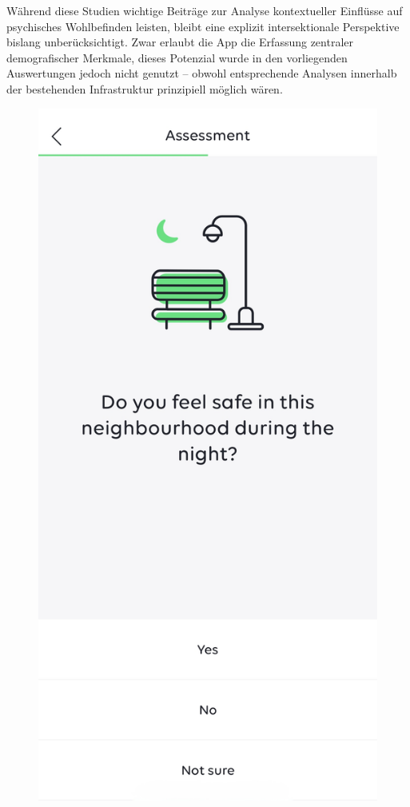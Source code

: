 Während diese Studien wichtige Beiträge zur Analyse kontextueller Einflüsse auf psychisches Wohlbefinden leisten, bleibt eine explizit intersektionale Perspektive bislang unberücksichtigt. Zwar erlaubt die App die Erfassung zentraler demografischer Merkmale, dieses Potenzial wurde in den vorliegenden Auswertungen jedoch nicht genutzt -- obwohl entsprechende Analysen innerhalb der bestehenden Infrastruktur prinzipiell möglich wären.


\begin{figure}[h]
    \centering
    \begin{minipage}[t]{0.38\textwidth}
        \centering
        \includegraphics[width=\textwidth]{Arbeit/Bilder/urban_mind01.jpeg}

\end{minipage}
\end{figure}
